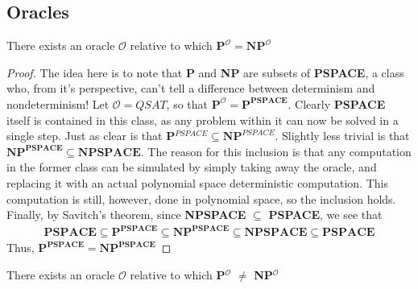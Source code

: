 \subsection{Oracles}
\begin{theorem}
    There exists an oracle $\mathcal{O}$ relative to which $\textbf{P}^{\mathcal{O}} = \textbf{NP}^{\mathcal{O}}$
\end{theorem}
\begin{proof}
    The idea here is to note that \textbf{P} and \textbf{NP} are subsets of \textbf{PSPACE}, a class who, from it's perspective, can't tell a difference between determinism and nondeterminism! Let $\mathcal{O} = QSAT$, so that $\textbf{P}^{\mathcal{O}} = \textbf{P}^{\textbf{PSPACE}}$. Clearly \textbf{PSPACE} itself is contained in this class, as any problem within it can now be solved in a single step. Just as clear is that \textbf{P}$^{PSPACE} \subseteq \textbf{NP}^{PSPACE}$. Slightly less trivial is that $\textbf{NP}^{\textbf{PSPACE}} \subseteq \textbf{NPSPACE}$. The reason for this inclusion is that any computation in the former class can be simulated by simply taking away the oracle, and replacing it with an actual polynomial space deterministic computation. This computation is still, however, done in polynomial space, so the inclusion holds. Finally, by Savitch's theorem, since \textbf{NPSPACE} $\subseteq$ \textbf{PSPACE}, we see that
    \begin{align}
        \textbf{PSPACE} \subseteq \textbf{P}^{\textbf{PSPACE}} \subseteq \textbf{NP}^{\textbf{PSPACE}} \subseteq \textbf{NPSPACE} \subseteq \textbf{PSPACE}
    \end{align}
    Thus, $\textbf{P}^{\textbf{PSPACE}} = \textbf{NP}^{\textbf{PSPACE}}$
\end{proof}
\begin{theorem}
    There exists an oracle $\mathcal{O}$ relative to which \textbf{P$^{\mathcal{O}}$} $\neq$ \textbf{NP}$^{\mathcal{O}}$ 
\end{theorem}
